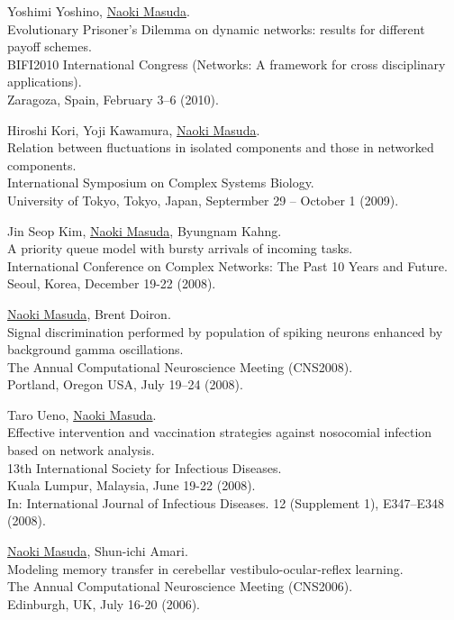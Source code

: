 \documentclass[11pt,letter]{article}
\begin{document}
\begin{etaremune}
\item Yoshimi Yoshino, \underline{Naoki Masuda}.\\
Evolutionary Prisoner's Dilemma on dynamic networks: results for different payoff schemes.\\
BIFI2010 International Congress (Networks: A framework for cross disciplinary applications).\\
Zaragoza, Spain, February 3--6 (2010).

\item Hiroshi Kori, Yoji Kawamura, \underline{Naoki Masuda}.\\
Relation between fluctuations in isolated components and those in networked components.\\
International Symposium on Complex Systems Biology.\\
University of Tokyo, Tokyo, Japan, Septermber 29 -- October 1 (2009).

\item Jin Seop Kim, \underline{Naoki Masuda}, Byungnam Kahng.\\
A priority queue model with bursty arrivals of incoming tasks.\\
International Conference on Complex Networks: The Past 10 Years and Future.\\
Seoul, Korea, December 19-22 (2008).

\item \underline{Naoki Masuda}, Brent Doiron.\\
Signal discrimination performed by population of spiking neurons enhanced by background gamma oscillations.\\
The Annual Computational Neuroscience Meeting (CNS2008).\\
Portland, Oregon USA, July 19--24 (2008).

\item Taro Ueno, \underline{Naoki Masuda}.\\
Effective intervention and vaccination strategies against nosocomial infection based on network analysis.\\
13th International Society for Infectious Diseases.\\
Kuala Lumpur, Malaysia, June 19-22 (2008).\\
In: International Journal of Infectious Diseases. 12 (Supplement 1), E347--E348 (2008).

\item \underline{Naoki Masuda}, Shun-ichi Amari.\\
Modeling memory transfer in cerebellar vestibulo-ocular-reflex learning.\\
The Annual Computational Neuroscience Meeting (CNS2006).\\
Edinburgh, UK, July 16-20 (2006).


\end{etaremune}
\end{document}
